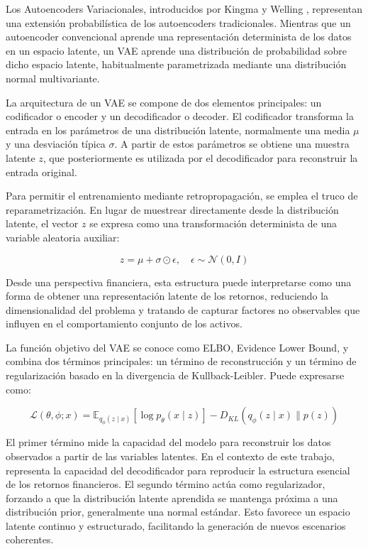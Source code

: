 Los Autoencoders Variacionales, introducidos por Kingma y Welling \cite{kingma2013auto}, representan una extensión probabilística de los autoencoders tradicionales. Mientras que un autoencoder convencional aprende una representación determinista de los datos en un espacio latente, un VAE aprende una distribución de probabilidad sobre dicho espacio latente, habitualmente parametrizada mediante una distribución normal multivariante.

La arquitectura de un VAE se compone de dos elementos principales: un codificador o encoder y un decodificador o decoder. El codificador transforma la entrada en los parámetros de una distribución latente, normalmente una media $\mu$ y una desviación típica $\sigma$. A partir de estos parámetros se obtiene una muestra latente $z$, que posteriormente es utilizada por el decodificador para reconstruir la entrada original.

Para permitir el entrenamiento mediante retropropagación, se emplea el truco de reparametrización. En lugar de muestrear directamente desde la distribución latente, el vector $z$ se expresa como una transformación determinista de una variable aleatoria auxiliar:

\begin{equation}
z = \mu + \sigma \odot \epsilon,
\quad
\epsilon \sim \mathcal{N}(0,I)
\end{equation}

Desde una perspectiva financiera, esta estructura puede interpretarse como una forma de obtener una representación latente de los retornos, reduciendo la dimensionalidad del problema y tratando de capturar factores no observables que influyen en el comportamiento conjunto de los activos.

La función objetivo del VAE se conoce como ELBO, Evidence Lower Bound, y combina dos términos principales: un término de reconstrucción y un término de regularización basado en la divergencia de Kullback-Leibler. Puede expresarse como:

\begin{equation}
\mathcal{L}(\theta,\phi;x)
=
\mathbb{E}_{q_{\phi}(z \mid x)}
\left[
\log p_{\theta}(x \mid z)
\right]
-
D_{KL}
\left(
q_{\phi}(z \mid x)
\parallel
p(z)
\right)
\end{equation}

El primer término mide la capacidad del modelo para reconstruir los datos observados a partir de las variables latentes. En el contexto de este trabajo, representa la capacidad del decodificador para reproducir la estructura esencial de los retornos financieros. El segundo término actúa como regularizador, forzando a que la distribución latente aprendida se mantenga próxima a una distribución prior, generalmente una normal estándar. Esto favorece un espacio latente continuo y estructurado, facilitando la generación de nuevos escenarios coherentes.

